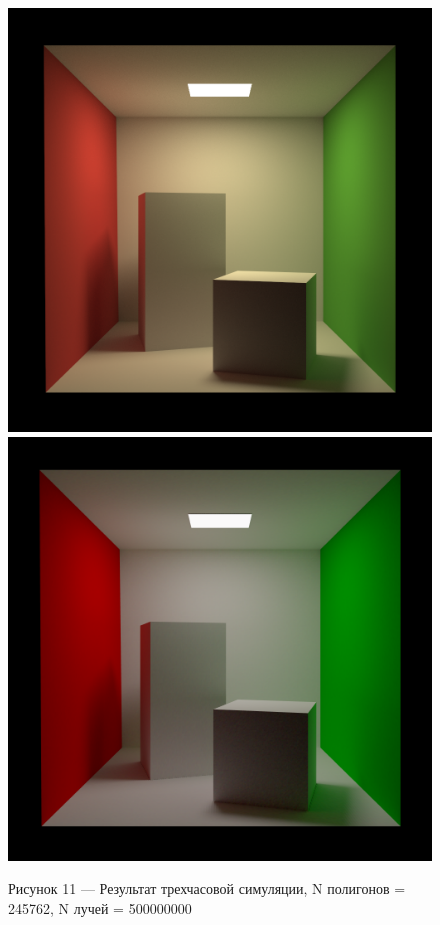 \documentclass[12pt]{article}
\begin{document}
\begin{figure}[h]
\centering
\includegraphics[scale=0.25]{reference_cornell.png}
\includegraphics[scale=0.25]{500mil.png}
\caption*{Рисунок 11 --- Результат трехчасовой симуляции, N полигонов = 245762, N лучей = 500000000}
\end{figure}
\end{document}
